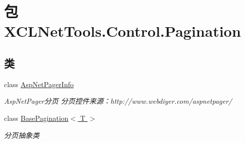 \hypertarget{namespace_x_c_l_net_tools_1_1_control_1_1_pagination}{\section{包 X\-C\-L\-Net\-Tools.\-Control.\-Pagination}
\label{namespace_x_c_l_net_tools_1_1_control_1_1_pagination}
}
\subsection*{类}
\begin{DoxyCompactItemize}
\item 
class \hyperlink{class_x_c_l_net_tools_1_1_control_1_1_pagination_1_1_asp_net_pager_info}{Asp\-Net\-Pager\-Info}
\begin{DoxyCompactList}\small\item\em Asp\-Net\-Pager分页 分页控件来源：http\-://www.webdiyer.\-com/aspnetpager/ \end{DoxyCompactList}\item 
class \hyperlink{class_x_c_l_net_tools_1_1_control_1_1_pagination_1_1_base_pagination_3_01_t_01_4}{Base\-Pagination$<$ T $>$}
\begin{DoxyCompactList}\small\item\em 分页抽象类 \end{DoxyCompactList}\end{DoxyCompactItemize}
